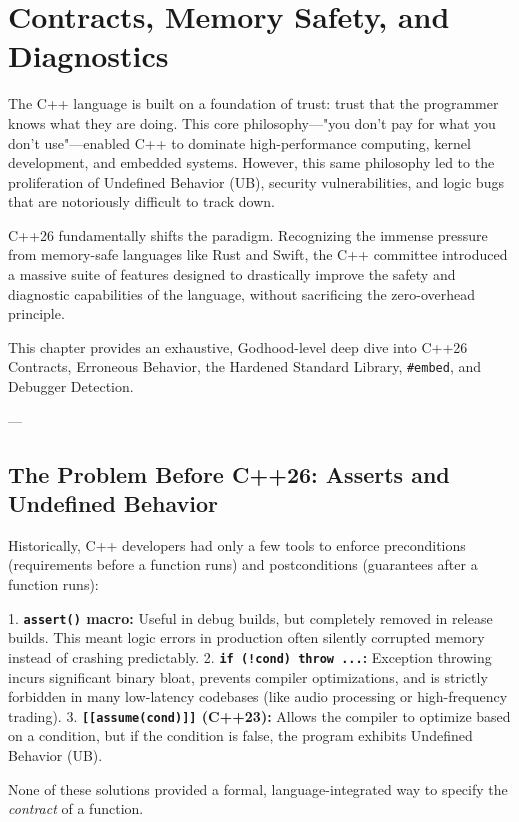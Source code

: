 \chapter{Contracts, Memory Safety, and Diagnostics}

The C++ language is built on a foundation of trust: trust that the programmer knows what they are doing. This core philosophy—"you don't pay for what you don't use"—enabled C++ to dominate high-performance computing, kernel development, and embedded systems. However, this same philosophy led to the proliferation of Undefined Behavior (UB), security vulnerabilities, and logic bugs that are notoriously difficult to track down.

C++26 fundamentally shifts the paradigm. Recognizing the immense pressure from memory-safe languages like Rust and Swift, the C++ committee introduced a massive suite of features designed to drastically improve the safety and diagnostic capabilities of the language, without sacrificing the zero-overhead principle.

This chapter provides an exhaustive, Godhood-level deep dive into C++26 Contracts, Erroneous Behavior, the Hardened Standard Library, \texttt{#embed}, and Debugger Detection.

---

\section{The Problem Before C++26: Asserts and Undefined Behavior}

Historically, C++ developers had only a few tools to enforce preconditions (requirements before a function runs) and postconditions (guarantees after a function runs):

1. \textbf{\texttt{assert()} macro:} Useful in debug builds, but completely removed in release builds. This meant logic errors in production often silently corrupted memory instead of crashing predictably.
2. \textbf{\texttt{if (!cond) throw ...}:} Exception throwing incurs significant binary bloat, prevents compiler optimizations, and is strictly forbidden in many low-latency codebases (like audio processing or high-frequency trading).
3. \textbf{\texttt{[[assume(cond)]]} (C++23):} Allows the compiler to optimize based on a condition, but if the condition is false, the program exhibits Undefined Behavior (UB).

None of these solutions provided a formal, language-integrated way to specify the \textit{contract} of a function.

